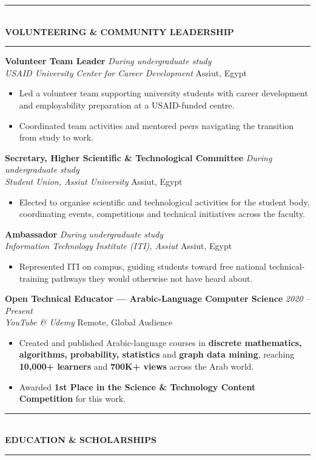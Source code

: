 \documentclass[10pt, a4paper]{article}
\newcommand{\cvsection}[1]{%
  \vspace{3pt}%
  {\color{navy}\rule{\linewidth}{1.1pt}}\\[0.5pt]%
  {\color{navy}\bfseries\fontsize{9.5}{11}\selectfont\uppercase{#1}}\\[-4pt]%
  {\color{teal}\rule{\linewidth}{0.6pt}}%
  \vspace{2pt}%
}
\newcommand{\cventry}[4]{%
  \vspace{2.5pt}%
  \textbf{\color{darkgray}#1} \hfill {\color{midgray}\textit{#3}}\\[-1.5pt]%
  {\color{teal}\textit{#2}} \hfill {\color{midgray}#4}%
}
\newenvironment{cvitems}{%
  \begin{itemize}[leftmargin=11pt, itemsep=0.5pt, parsep=0pt, topsep=1pt,
                  label={\textcolor{teal}{$\bullet$}}]
}{%
  \end{itemize}%
}
\begin{document}
\cvsection{Volunteering \& Community Leadership}

\cventry{Volunteer Team Leader}{USAID University Center for Career Development}
        {During undergraduate study}{Assiut, Egypt}
\begin{cvitems}
  \item Led a volunteer team supporting university students with career development and employability preparation at a USAID-funded centre.
  \item Coordinated team activities and mentored peers navigating the transition from study to work.
\end{cvitems}

\cventry{Secretary, Higher Scientific \& Technological Committee}{Student Union, Assiut University}
        {During undergraduate study}{Assiut, Egypt}
\begin{cvitems}
  \item Elected to organise scientific and technological activities for the student body, coordinating events, competitions and technical initiatives across the faculty.
\end{cvitems}

\cventry{Ambassador}{Information Technology Institute (ITI), Assiut}
        {During undergraduate study}{Assiut, Egypt}
\begin{cvitems}
  \item Represented ITI on campus, guiding students toward free national technical-training pathways they would otherwise not have heard about.
\end{cvitems}

\cventry{Open Technical Educator --- Arabic-Language Computer Science}{YouTube \& Udemy}
        {2020 -- Present}{Remote, Global Audience}
\begin{cvitems}
  \item Created and published Arabic-language courses in \textbf{discrete mathematics, algorithms, probability, statistics} and \textbf{graph data mining}, reaching \textbf{10,000+ learners} and \textbf{700K+ views} across the Arab world.
  \item Awarded \textbf{1st Place in the Science \& Technology Content Competition} for this work.
\end{cvitems}

\cvsection{Education \& Scholarships}
\end{document}
